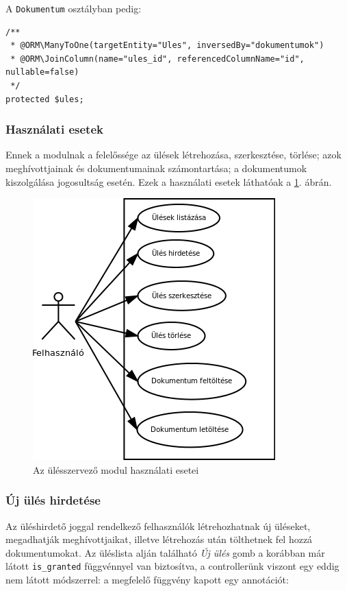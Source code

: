 \documentclass[a4paper,12pt,oneside]{report}
\begin{document}
A {\tt Dokumentum} osztályban pedig:

\begin{lstlisting}
/**
 * @ORM\ManyToOne(targetEntity="Ules", inversedBy="dokumentumok")
 * @ORM\JoinColumn(name="ules_id", referencedColumnName="id", nullable=false)
 */
protected $ules;
\end{lstlisting}

\subsubsection*{Használati esetek}

Ennek a modulnak a felelőssége az ülések létrehozása, szerkesztése, törlése; azok meghívottjainak és dokumentumainak számontartása; a dokumentumok kiszolgálása jogosultság esetén. Ezek a használati esetek láthatóak a \ref{fig:ules_usecase}. ábrán.

\begin{figure}[h]
    \centering
    \includegraphics[width=.65\textwidth]{ules_usecase.png}
    \caption{Az ülésszervező modul használati esetei}
    \label{fig:ules_usecase}
\end{figure}

\subsubsection*{Új ülés hirdetése}

Az üléshirdető joggal rendelkező felhasználók létrehozhatnak új üléseket, megadhatják meghívottjaikat, illetve létrehozás után tölthetnek fel hozzá dokumentumokat. Az üléslista alján található {\it Új ülés} gomb a korábban már látott {\tt is\_granted} függvénnyel van biztosítva, a controllerünk viszont egy eddig nem látott módszerrel: a megfelelő függvény kapott egy annotációt:
\end{document}
